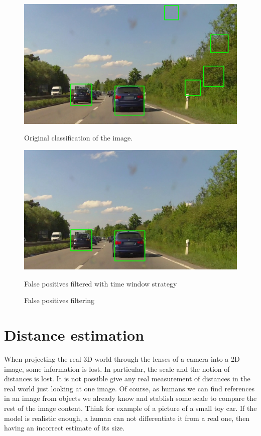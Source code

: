 \begin{figure}    
\begin{minipage}[t]{0.45\textwidth}
\includegraphics[width=\linewidth]{img/outliers_original.jpg}
\caption{Original classification of the image.}
\end{minipage}
\begin{minipage}[t]{0.45\textwidth}
\includegraphics[width=\linewidth]{img/outliers_filtered.jpg}
\caption{False positives filtered with time window strategy}
\end{minipage}
\caption{False positives filtering}
\label{fig:distance-pictures}
\end{figure}



\section{Distance estimation} %
\label{sec:Distance-estimation}

When projecting the real 3D world through the lenses of a camera into a 2D
image, some information is lost. In particular, the scale and the notion of
distances is lost. It is not possible give any real
measurement of distances in the real world just looking at one image. 
Of course, as humans we can find references in an image from objects we already
know and stablish some scale to compare the rest of the image content. Think for
example of a picture of a small toy car. If the model is realistic 
enough, a human can not differentiate it from a real one, then having an
incorrect estimate of its size.

